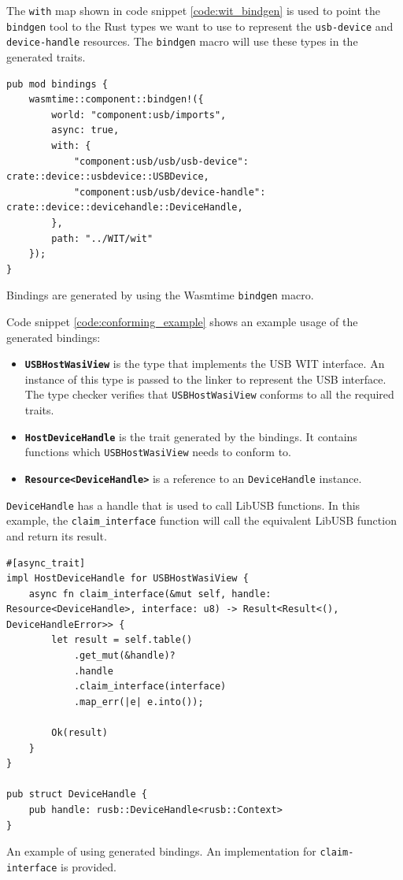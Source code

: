 The \texttt{with} map shown in code snippet \ref{code:wit_bindgen} is used to point the \texttt{bindgen} tool to the Rust types we want to use to represent the \texttt{usb-device} and \texttt{device-handle} resources. The \texttt{bindgen} macro will use these types in the generated traits.\\

\begin{code}
\begin{verbatim}
pub mod bindings {
	wasmtime::component::bindgen!({
		world: "component:usb/imports",
		async: true,
		with: {
			"component:usb/usb/usb-device": crate::device::usbdevice::USBDevice,
			"component:usb/usb/device-handle": crate::device::devicehandle::DeviceHandle,
		},
		path: "../WIT/wit"
	});
}
\end{verbatim} 
\caption{Bindings are generated by using the Wasmtime \texttt{bindgen} macro.}
\label{code:wit_bindgen}
\end{code}

Code snippet \ref{code:conforming_example} shows an example usage of the generated bindings:
\begin{itemize}
\item \textbf{\texttt{USBHostWasiView}} is the type that implements the \acrshort{USB} \acrshort{WIT} interface. An instance of this type is passed to the linker to represent the \acrshort{USB} interface. The type checker verifies that \texttt{USBHostWasiView} conforms to all the required traits.
\item \textbf{\texttt{HostDeviceHandle}} is the trait generated by the bindings. It contains functions which \texttt{USBHostWasiView} needs to conform to.
\item \textbf{\texttt{Resource<DeviceHandle>}} is a reference to an \texttt{DeviceHandle} instance. 
\end{itemize}

\texttt{DeviceHandle} has a handle that is used to call LibUSB functions. In this example, the \texttt{claim\_interface} function will call the equivalent LibUSB function and return its result.\\

\begin{code}
\begin{verbatim}
#[async_trait]
impl HostDeviceHandle for USBHostWasiView {
	async fn claim_interface(&mut self, handle: Resource<DeviceHandle>, interface: u8) -> Result<Result<(), DeviceHandleError>> {
		let result = self.table()
			.get_mut(&handle)?
			.handle
			.claim_interface(interface)
			.map_err(|e| e.into());
	
		Ok(result)
	}
}

pub struct DeviceHandle {
	pub handle: rusb::DeviceHandle<rusb::Context>
}
\end{verbatim} 
\caption{An example of using generated bindings. An implementation for \texttt{claim-interface} is provided.}
\label{code:conforming_example}
\end{code}

